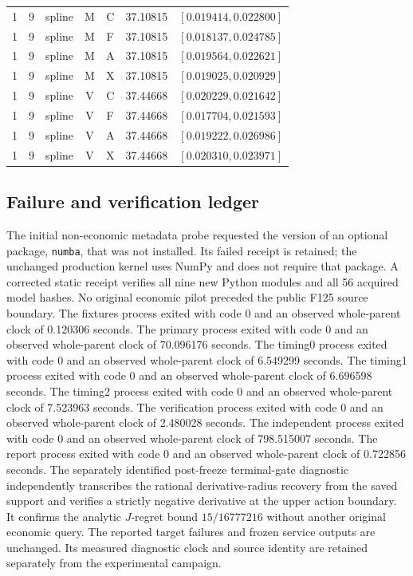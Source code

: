 \begin{longtable}{r r l c c r l}
1 & 9 & spline & M & C & 37.10815 & $[0.019414,0.022800]$ \\
1 & 9 & spline & M & F & 37.10815 & $[0.018137,0.024785]$ \\
1 & 9 & spline & M & A & 37.10815 & $[0.019564,0.022621]$ \\
1 & 9 & spline & M & X & 37.10815 & $[0.019025,0.020929]$ \\
1 & 9 & spline & V & C & 37.44668 & $[0.020229,0.021642]$ \\
1 & 9 & spline & V & F & 37.44668 & $[0.017704,0.021593]$ \\
1 & 9 & spline & V & A & 37.44668 & $[0.019222,0.026986]$ \\
1 & 9 & spline & V & X & 37.44668 & $[0.020310,0.023971]$ \\
\hline\end{longtable}\endgroup
\subsection{Failure and verification ledger}
The initial non-economic metadata probe requested the version of an optional package, \texttt{numba}, that was not installed. Its failed receipt is retained; the unchanged production kernel uses NumPy and does not require that package. A corrected static receipt verifies all nine new Python modules and all 56 acquired model hashes. No original economic pilot preceded the public F125 source boundary.
The fixtures process exited with code 0 and an observed whole-parent clock of 0.120306 seconds.
The primary process exited with code 0 and an observed whole-parent clock of 70.096176 seconds.
The timing0 process exited with code 0 and an observed whole-parent clock of 6.549299 seconds.
The timing1 process exited with code 0 and an observed whole-parent clock of 6.696598 seconds.
The timing2 process exited with code 0 and an observed whole-parent clock of 7.523963 seconds.
The verification process exited with code 0 and an observed whole-parent clock of 2.480028 seconds.
The independent process exited with code 0 and an observed whole-parent clock of 798.515007 seconds.
The report process exited with code 0 and an observed whole-parent clock of 0.722856 seconds.
The separately identified post-freeze terminal-gate diagnostic independently transcribes the rational derivative-radius recovery from the saved support and verifies a strictly negative derivative at the upper action boundary. It confirms the analytic $J$-regret bound $15/16777216$ without another original economic query. The reported target failures and frozen service outputs are unchanged. Its measured diagnostic clock and source identity are retained separately from the experimental campaign.
